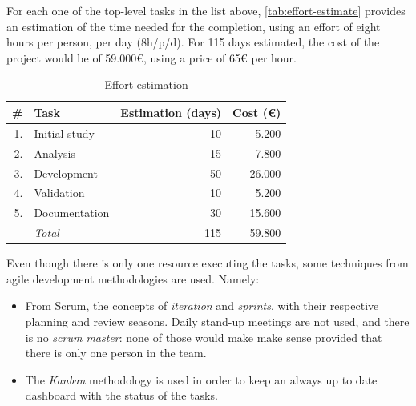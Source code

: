 For each one of the top-level tasks in the list above,
\autoref{tab:effort-estimate} provides an estimation of the time needed for
the completion, using an effort of eight hours per person, per day (8h/p/d).
For 115 days estimated, the cost of the project would be of 59.000€, using
a price of 65€ per hour.

\begin{table}
	\centering
	\begin{tabular}{rlrr}
		\toprule
		\# & Task & Estimation (days) & Cost (€) \\
		\midrule
		1. & Initial study     & 10 &  5.200 \\
		2. & Analysis          & 15 &  7.800 \\
		3. & Development       & 50 & 26.000 \\
		4. & Validation        & 10 &  5.200 \\
		5. & Documentation     & 30 & 15.600 \\
		\midrule
		   & \emph{Total}      & 115& 59.800 \\
		\bottomrule
	\end{tabular}
	\caption{Effort estimation}
	\label{tab:effort-estimate}
\end{table}

Even though there is only one resource executing the tasks, some techniques
from agile development methodologies are used. Namely:

\begin{itemize}
	\item From Scrum, the concepts of \emph{iteration} and \emph{sprints}, with
    their respective planning and review seasons. Daily stand-up meetings are
    not used, and there is no \emph{scrum master}: none of those would make
    make sense provided that there is only one person in the team.
  \item The \emph{Kanban} methodology is used in order to keep an always
		up to date dashboard with the status of the tasks.
\end{itemize}


